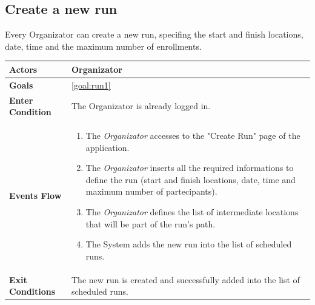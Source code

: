   \newpage
  \subsection{Create a new run}
Every Organizator can create a new run, specifing the start and finish locations, date, time and the maximum number of enrollments.

\begin{table}[H]
	\centering
    
    \begin{tabular}{|p{3.5cm}|p{10.3cm}|}
    
    \hline
    \textbf{\large{Actors}}  			& \tabitem Organizator 	\\
    				 					
    \hline
    \textbf{\large{Goals}} 				& \ref{goal:run1}\\
    
    \hline
    \textbf{\large{Enter Condition}}	& The Organizator is already logged in.		\\
    
    \hline
    \textbf{\large{Events Flow}}		& \begin{enumerate}[leftmargin=0.5cm]
                                          	\item The \emph{Organizator}  accesses to the "Create Run" page of the application.
                                            \item The \emph{Organizator} inserts all the required informations to define the run (start and finish locations, date, time and maximum number of partecipants).
                                             \item The \emph{Organizator} defines the list of intermediate locations that will be part of the run's path.
                                            \item The System adds the new run into the list of scheduled runs.
                                           
                                          \end{enumerate}
    										\\
    \hline
    \textbf{\large{Exit Conditions}}    & The new run is created and successfully added into the list of scheduled runs.  \\
    

\end{tabular}
\end{table}
